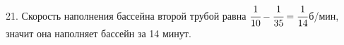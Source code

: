 21. Скорость наполнения бассейна второй трубой равна $\cfrac{1}{10}-\cfrac{1}{35}=\cfrac{1}{14}$б/мин, значит она наполняет бассейн за 14 минут.\\
